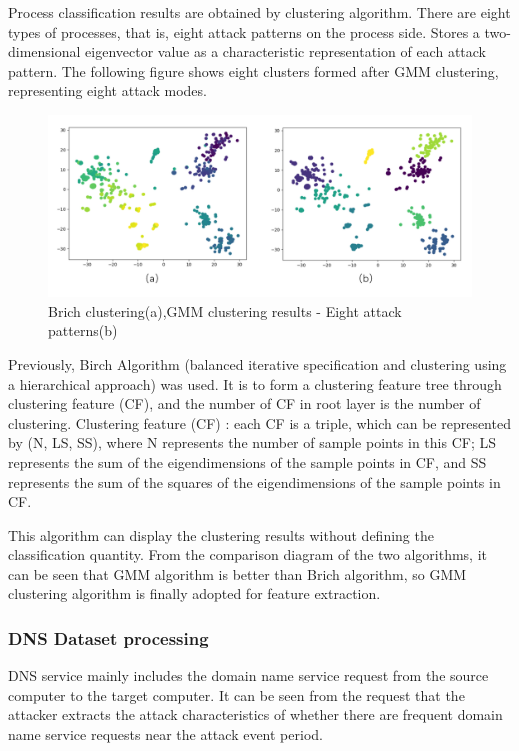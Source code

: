 \documentclass[12pt,journal,draftcls,doublespace, letterpaper,onecolumn]{IEEEtran}
\begin{document}
Process classification results are obtained by clustering algorithm. There are eight types of processes, that is, eight attack patterns on the process side. Stores a two-dimensional eigenvector value as a characteristic representation of each attack pattern. The following figure shows eight clusters formed after GMM clustering, representing eight attack modes.

\begin{figure}[htpb]
	\centering
	\includegraphics [width=1\textwidth]{8.png}
	\caption{Brich clustering(a),GMM clustering results - Eight attack patterns(b)}
	\label{fig}
\end{figure}

Previously, Birch Algorithm (balanced iterative specification and clustering using a hierarchical approach) was used. It is to form a clustering feature tree through clustering feature (CF), and the number of CF in root layer is the number of clustering. Clustering feature (CF) : each CF is a triple, which can be represented by (N, LS, SS), where N represents the number of sample points in this CF; LS represents the sum of the eigendimensions of the sample points in CF, and SS represents the sum of the squares of the eigendimensions of the sample points in CF.

This algorithm can display the clustering results without defining the classification quantity. From the comparison diagram of the two algorithms, it can be seen that GMM algorithm is better than Brich algorithm, so GMM clustering algorithm is finally adopted for feature extraction.

\subsubsection{DNS Dataset processing}
DNS service mainly includes the domain name service request from the source computer to the target computer. It can be seen from the request that the attacker extracts the attack characteristics of whether there are frequent domain name service requests near the attack event period.
\end{document}
